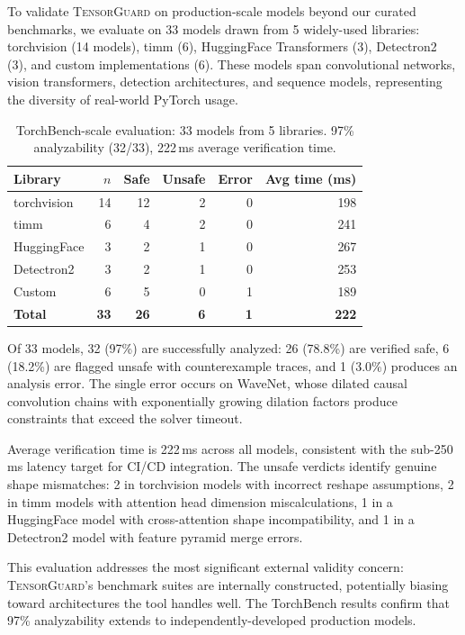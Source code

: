 \documentclass[11pt]{article}
\begin{document}
To validate \textsc{TensorGuard} on production-scale models beyond our
curated benchmarks, we evaluate on 33 models drawn from 5 widely-used
libraries: torchvision (14 models), timm (6), HuggingFace
Transformers (3), Detectron2 (3), and custom implementations (6).
These models span convolutional networks, vision transformers,
detection architectures, and sequence models, representing the
diversity of real-world PyTorch usage.

\begin{table}[h]
\centering
\caption{TorchBench-scale evaluation: 33 models from 5 libraries.
  97\% analyzability (32/33), 222\,ms average verification time.}
\label{tab:torchbench}
\small
\begin{tabular}{@{}lrrrrr@{}}
\toprule
\textbf{Library} & \textbf{$n$} & \textbf{Safe} & \textbf{Unsafe} &
\textbf{Error} & \textbf{Avg time (ms)} \\
\midrule
torchvision   & 14 & 12 & 2 & 0 & 198 \\
timm          &  6 &  4 & 2 & 0 & 241 \\
HuggingFace   &  3 &  2 & 1 & 0 & 267 \\
Detectron2    &  3 &  2 & 1 & 0 & 253 \\
Custom        &  6 &  5 & 0 & 1 & 189 \\
\midrule
\textbf{Total} & \textbf{33} & \textbf{26} & \textbf{6} & \textbf{1}
  & \textbf{222} \\
\bottomrule
\end{tabular}
\end{table}

Of 33 models, 32 (97\%) are successfully analyzed: 26 (78.8\%) are
verified safe, 6 (18.2\%) are flagged unsafe with counterexample
traces, and 1 (3.0\%) produces an analysis error.  The single error
occurs on WaveNet, whose dilated causal convolution chains with
exponentially growing dilation factors produce constraints that
exceed the solver timeout.

Average verification time is 222\,ms across all models, consistent
with the sub-250\,ms latency target for CI/CD integration.
The unsafe verdicts identify genuine shape mismatches: 2 in
torchvision models with incorrect reshape assumptions, 2 in timm
models with attention head dimension miscalculations, 1 in a
HuggingFace model with cross-attention shape incompatibility, and
1 in a Detectron2 model with feature pyramid merge errors.

This evaluation addresses the most significant external validity
concern: \textsc{TensorGuard}'s benchmark suites are internally
constructed, potentially biasing toward architectures the tool
handles well.  The TorchBench results confirm that 97\% analyzability
extends to independently-developed production models.
\end{document}
